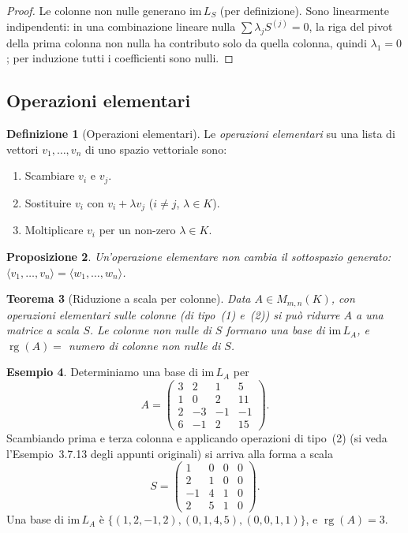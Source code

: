 \documentclass[11pt, a4paper]{book}
\theoremstyle{definition}
\newtheorem{definizione}{Definizione}[section]
\newtheorem{esempio}[definizione]{Esempio}
\theoremstyle{plain}
\newtheorem{teorema}[definizione]{Teorema}
\newtheorem{proposizione}[definizione]{Proposizione}
\theoremstyle{remark}
\newcommand{\im}{\mathrm{im}\,}
\DeclareMathOperator{\rg}{rg}
\begin{document}
\begin{proof}
Le colonne non nulle generano $\im L_S$ (per definizione). Sono linearmente indipendenti: in una combinazione lineare nulla $\sum \lambda_j S^{(j)} = 0$, la riga del pivot della prima colonna non nulla ha contributo solo da quella colonna, quindi $\lambda_1 = 0$; per induzione tutti i coefficienti sono nulli.
\end{proof}

\subsection{Operazioni elementari}

\begin{defbox}
\begin{definizione}[Operazioni elementari]
Le \emph{operazioni elementari} su una lista di vettori $v_1, \ldots, v_n$ di uno spazio vettoriale sono:
\begin{enumerate}
  \item Scambiare $v_i$ e $v_j$.
  \item Sostituire $v_i$ con $v_i + \lambda v_j$ ($i \neq j$, $\lambda \in K$).
  \item Moltiplicare $v_i$ per un non-zero $\lambda \in K$.
\end{enumerate}
\end{definizione}
\end{defbox}

\begin{proposizione}
Un'operazione elementare non cambia il sottospazio generato: $\langle v_1, \ldots, v_n \rangle = \langle w_1, \ldots, w_n \rangle$.
\end{proposizione}

\begin{teorema}[Riduzione a scala per colonne]
Data $A \in M_{m,n}(K)$, con operazioni elementari sulle colonne (di tipo~(1) e~(2)) si può ridurre $A$ a una matrice a scala $S$. Le colonne non nulle di $S$ formano una base di $\im L_A$, e $\rg(A) = $ numero di colonne non nulle di $S$.
\end{teorema}

\begin{exbox}
\begin{esempio}
Determiniamo una base di $\im L_A$ per
\[
  A = \begin{pmatrix} 3 & 2 & 1 & 5 \\ 1 & 0 & 2 & 11 \\ 2 & -3 & -1 & -1 \\ 6 & -1 & 2 & 15 \end{pmatrix}.
\]
Scambiando prima e terza colonna e applicando operazioni di tipo~(2) (si veda l'Esempio~3.7.13 degli appunti originali) si arriva alla forma a scala
\[
  S = \begin{pmatrix} 1 & 0 & 0 & 0 \\ 2 & 1 & 0 & 0 \\ -1 & 4 & 1 & 0 \\ 2 & 5 & 1 & 0 \end{pmatrix}.
\]
Una base di $\im L_A$ è $\{(1,2,-1,2), (0,1,4,5), (0,0,1,1)\}$, e $\rg(A) = 3$.
\end{esempio}
\end{exbox}
\end{document}
